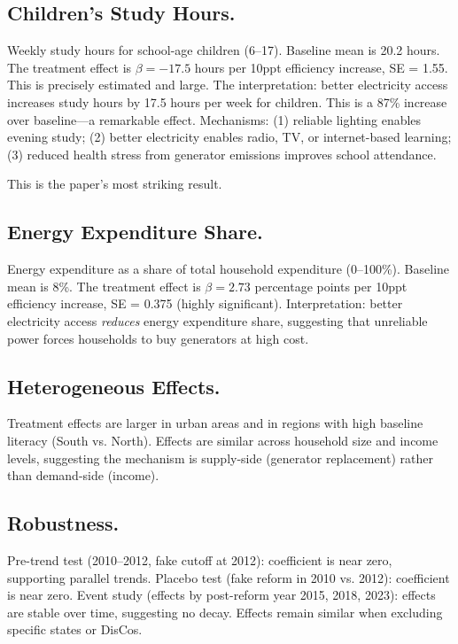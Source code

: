 \documentclass[12pt]{article}
\begin{document}
\subsection*{Children's Study Hours.}
Weekly study hours for school-age children (6--17). Baseline mean is 20.2 hours. The treatment effect is $\beta = -17.5$ hours per 10ppt efficiency increase, SE = 1.55. This is precisely estimated and large. The interpretation: better electricity access increases study hours by 17.5 hours per week for children. This is a 87\% increase over baseline---a remarkable effect. Mechanisms: (1) reliable lighting enables evening study; (2) better electricity enables radio, TV, or internet-based learning; (3) reduced health stress from generator emissions improves school attendance.

This is the paper's most striking result.

\subsection*{Energy Expenditure Share.}
Energy expenditure as a share of total household expenditure (0--100\%). Baseline mean is 8\%. The treatment effect is $\beta = 2.73$ percentage points per 10ppt efficiency increase, SE = 0.375 (highly significant). Interpretation: better electricity access \textit{reduces} energy expenditure share, suggesting that unreliable power forces households to buy generators at high cost.

\subsection*{Heterogeneous Effects.}
Treatment effects are larger in urban areas and in regions with high baseline literacy (South vs. North). Effects are similar across household size and income levels, suggesting the mechanism is supply-side (generator replacement) rather than demand-side (income).



\subsection*{Robustness.}
Pre-trend test (2010--2012, fake cutoff at 2012): coefficient is near zero, supporting parallel trends. Placebo test (fake reform in 2010 vs. 2012): coefficient is near zero. Event study (effects by post-reform year 2015, 2018, 2023): effects are stable over time, suggesting no decay. Effects remain similar when excluding specific states or DisCos.
\end{document}
